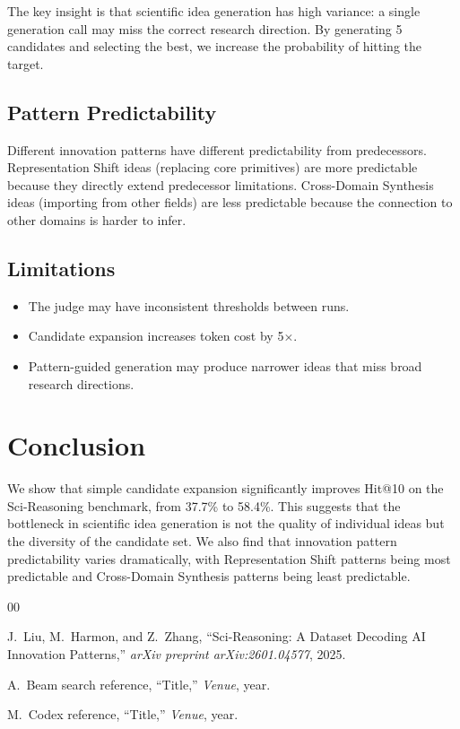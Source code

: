 \documentclass[conference]{IEEEtran}
\begin{document}
The key insight is that scientific idea generation has high variance: a single generation call may miss the correct research direction. By generating 5 candidates and selecting the best, we increase the probability of hitting the target.

\subsection{Pattern Predictability}

Different innovation patterns have different predictability from predecessors. Representation Shift ideas (replacing core primitives) are more predictable because they directly extend predecessor limitations. Cross-Domain Synthesis ideas (importing from other fields) are less predictable because the connection to other domains is harder to infer.

\subsection{Limitations}

\begin{itemize}
    \item The judge may have inconsistent thresholds between runs.
    \item Candidate expansion increases token cost by 5$\times$.
    \item Pattern-guided generation may produce narrower ideas that miss broad research directions.
\end{itemize}

\section{Conclusion}

We show that simple candidate expansion significantly improves Hit@10 on the Sci-Reasoning benchmark, from 37.7\% to 58.4\%. This suggests that the bottleneck in scientific idea generation is not the quality of individual ideas but the diversity of the candidate set. We also find that innovation pattern predictability varies dramatically, with Representation Shift patterns being most predictable and Cross-Domain Synthesis patterns being least predictable.

\begin{thebibliography}{00}

J.~Liu, M.~Harmon, and Z.~Zhang, ``Sci-Reasoning: A Dataset Decoding AI Innovation Patterns,'' \textit{arXiv preprint arXiv:2601.04577}, 2025.

A.~Beam search reference, ``Title,'' \textit{Venue}, year.

M.~Codex reference, ``Title,'' \textit{Venue}, year.

\end{thebibliography}
\end{document}
